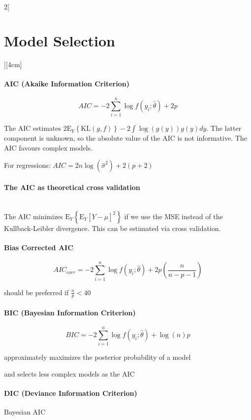 \documentclass[8pt]{extarticle}
\begin{document}
\begin{multicols}{2}[\section{Model Selection}][4cm]

\paragraph{AIC (Akaike Information Criterion)}

$$AIC = -2\sum_{i=1}^n \log f(y_i;\hat{\theta}) + 2p$$

\noindent The AIC estimates $2\mathrm{E}_{Y}\left\{\mathrm{KL}(g,f)\right\} - 2\int\log(g(y))g(y)dy$. The latter component is unknown, so the absolute value of the AIC is not informative. The AIC favours complex models. 

For regressions: $AIC= 2n\log(\hat{\sigma}^2) + 2(p+2)$

\paragraph{The AIC as theoretical cross validation} \ \\

\noindent The AIC minimizes $\mathrm{E}_Y\left\{\mathrm{E}_Y\left[Y-\hat{\mu}\right]^2\right\}$ if we use the MSE instead of the Kullback-Leibler divergence. This can be estimated via cross validation.

\paragraph{Bias Corrected AIC}

$$AIC_{corr} = -2\sum_{i=1}^n \log f(y_i;\hat{\theta}) +2p\left(\frac{n}{n{-}p{-}1}\right)$$

 should be preferred if $\frac{n}{p}<40$
 
\paragraph{BIC (Bayesian Information Criterion)}
 
$$BIC = -2\sum_{i=1}^n \log f(y_i;\hat{\theta}) + \log(n)p$$

\noindent approximately maximizes the posterior probability of a model

and selects less complex models as the AIC

\paragraph{DIC (Deviance Information Criterion)} Bayesian AIC


\end{multicols}
\end{document}
